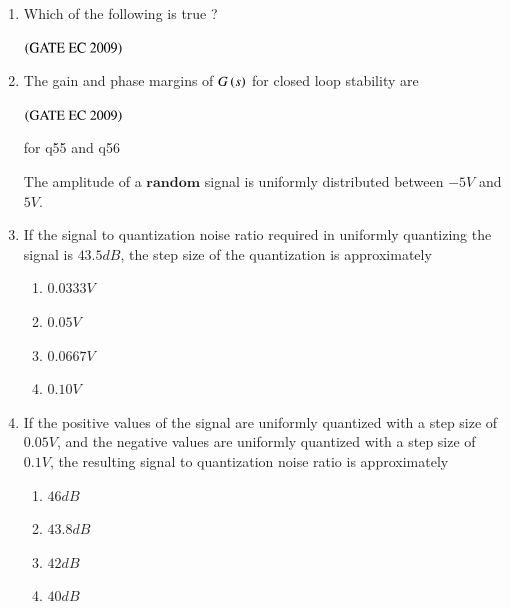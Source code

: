 \documentclass[journal,12pt,onecolumn]{IEEEtran}
\theoremstyle{remark}
\begin{document}
\begin{enumerate}
\item Which of the following is true ?
\begin{enumerate}
\end{enumerate}
\hfill $\brak{\text{GATE EC 2009}}$

\item The gain and phase margins of $G\brak{s}$ for closed loop stability are
\begin{enumerate}
\end{enumerate}
\hfill $\brak{\text{GATE EC 2009}}$

for q55 and q56 

The amplitude of a $\textbf{random}$ signal is uniformly distributed between $-5V$ and $5V$.

\item If the signal to quantization noise ratio required in uniformly quantizing the signal is $43.5 dB$, the step size of the quantization is approximately 
\begin{enumerate}
    \item $0.0333 V$
    \item $0.05 V$
    \item $0.0667 V$
    \item $0.10 V$
\end{enumerate}

\item If the positive values of the signal are uniformly quantized with a step size of $0.05 V$, and the negative values are uniformly quantized with a step size of $0.1 V$, the resulting signal to quantization noise ratio is approximately 
\begin{enumerate}
    \item $46 dB$
    \item $43.8 dB$
    \item $42 dB$
    \item $40 dB$
\end{enumerate}


\end{enumerate}
\end{document}
